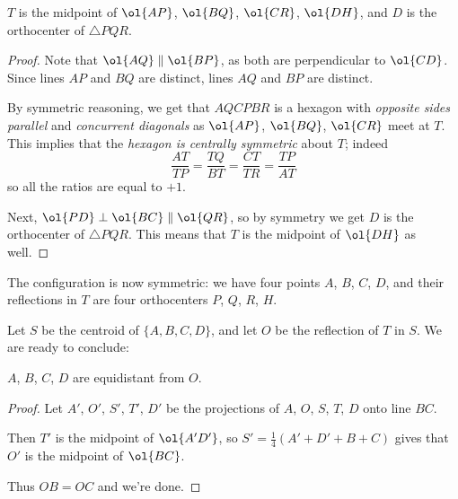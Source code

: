 \begin{claim*}
  $T$ is the midpoint of $\ol{AP}$, $\ol{BQ}$, $\ol{CR}$, $\ol{DH}$,
  and $D$ is the orthocenter of $\triangle PQR$.
\end{claim*}
\begin{proof}
  Note that $\ol{AQ} \parallel \ol{BP}$,
  as both are perpendicular to $\ol{CD}$.
  Since lines $AP$ and $BQ$ are distinct,
  lines $AQ$ and $BP$ are distinct.

  By symmetric reasoning, we get that $AQCPBR$
  is a hexagon with \emph{opposite sides parallel}
  and \emph{concurrent diagonals} as $\ol{AP}$, $\ol{BQ}$, $\ol{CR}$ meet at $T$.
  This implies that the \emph{hexagon is centrally symmetric} about $T$;
  indeed \[ \frac{AT}{TP} = \frac{TQ}{BT} = \frac{CT}{TR} = \frac{TP}{AT} \]
  so all the ratios are equal to $+1$.


  Next, $\ol{PD} \perp \ol{BC} \parallel \ol{QR}$,
  so by symmetry we get $D$ is the orthocenter of $\triangle PQR$.
  This means that $T$ is the midpoint of $\ol{DH}$ as well.
\end{proof}
\begin{corollary*}
  The configuration is now symmetric:
  we have four points $A$, $B$, $C$, $D$,
  and their reflections in $T$ are
  four orthocenters $P$, $Q$, $R$, $H$.
\end{corollary*}

Let $S$ be the centroid of $\{A, B, C, D\}$,
and let $O$ be the reflection of $T$ in $S$.
We are ready to conclude:
\begin{claim*}
  $A$, $B$, $C$, $D$ are equidistant from $O$.
\end{claim*}
\begin{proof}
  Let $A'$, $O'$, $S'$, $T'$, $D'$
  be the projections of $A$, $O$, $S$, $T$, $D$
  onto line $BC$.

  Then $T'$ is the midpoint of $\ol{A'D'}$,
  so $S' = \tfrac14(A'+D'+B+C)$
  gives that $O'$ is the midpoint of $\ol{BC}$.

  Thus $OB = OC$ and we're done.
\end{proof}
